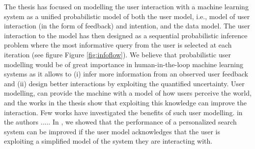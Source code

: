 \documentclass[dissertation,math,vertlayout,pdfa,colorlinks]{aaltoseries}
\begin{document}
The thesis has focused on modelling the user interaction with a machine learning system as a unified probabilistic model of both the user model, i.e., model of user interaction (in the form of feedback) and intention, and the data model. The user interaction to the model has then designed as a sequential probabilistic inference problem where the most informative query from the user is selected at each iteration (see figure Figure \ref{fig:infoflow}). We believe that probabilistic user modelling would be of great importance in human-in-the-loop machine learning systems as it allows to (i) infer more information from an observed user feedback and (ii) design better interactions by exploiting the quantified uncertainty. User modelling, can provide the machine with a model of how users perceive the world, and the works in the thesis show that exploiting this knowledge can improve the interaction. Few works have investigated the benefits of such user modelling. in \cite{NIPS2016_6155} the authors ..... In \cite{peltola2019machine}, we showed that the performance of a personalized search system can be improved if the user model acknowledges that the user is exploiting a simplified model of the system they are interacting with. 









\renewcommand{\bibname}{References}
\LARGE  %






\end{document}
